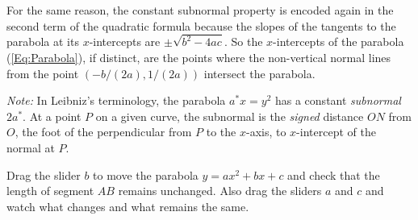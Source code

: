 \documentclass{ximera}
\begin{document}

For the same reason, the constant subnormal property is encoded again in the second term of the quadratic formula because the slopes of the tangents to the parabola at its $x$-intercepts are $\pm \sqrt{b^2-4ac}$. So the $x$-intercepts of the parabola (\ref{Eq:Parabola}), if distinct, are the points where the non-vertical normal lines from the point $(-b/(2a), 1/(2a))$ intersect the parabola.

\emph{Note:} In Leibniz's terminology, the parabola $a^* x=y^2$ has a constant \emph{subnormal} $2a^*$. At a point $P$ on a given curve, the subnormal is the \emph{signed} distance $ON$ from $O$, the foot of the perpendicular from $P$ to the $x$-axis, to $x$-intercept of the normal at $P$. %

\begin{exploration}\label{exp:cq1}
Drag the slider $b$ to move the parabola $y=ax^2 +bx+c$ and check that the length of segment $AB$ remains unchanged. Also drag the sliders $a$ and $c$ and watch what changes and what remains the same.
 
 
\begin{onlineOnly}
    \begin{center}
 
\end{center}
\end{onlineOnly}
\end{exploration}


\end{document}
